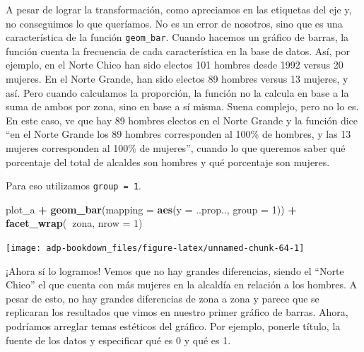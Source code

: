 \documentclass[]{book}
\newenvironment{Shaded}{\begin{snugshade}}{\end{snugshade}}
\newcommand{\DataTypeTok}[1]{\textcolor[rgb]{0.13,0.29,0.53}{#1}}
\newcommand{\DecValTok}[1]{\textcolor[rgb]{0.00,0.00,0.81}{#1}}
\newcommand{\KeywordTok}[1]{\textcolor[rgb]{0.13,0.29,0.53}{\textbf{#1}}}
\newcommand{\NormalTok}[1]{#1}
\newcommand{\OperatorTok}[1]{\textcolor[rgb]{0.81,0.36,0.00}{\textbf{#1}}}
\newcommand{\StringTok}[1]{\textcolor[rgb]{0.31,0.60,0.02}{#1}}
\begin{document}
A pesar de lograr la transformación, como apreciamos en las etiquetas
del eje y, no conseguimos lo que queríamos. No es un error de nosotros,
sino que es una característica de la función \texttt{geom\_bar}. Cuando
hacemos un gráfico de barras, la función cuenta la frecuencia de cada
característica en la base de datos. Así, por ejemplo, en el Norte Chico
han sido electos 101 hombres desde 1992 versus 20 mujeres. En el Norte
Grande, han sido electos 89 hombres versus 13 mujeres, y así. Pero
cuando calculamos la proporción, la función no la calcula en base a la
suma de ambos por zona, sino en base a sí misma. Suena complejo, pero no
lo es. En este caso, ve que hay 89 hombres electos en el Norte Grande y
la función dice ``en el Norte Grande los 89 hombres corresponden al
100\% de hombres, y las 13 mujeres corresponden al 100\% de mujeres'',
cuando lo que queremos saber qué porcentaje del total de alcaldes son
hombres y qué porcentaje son mujeres.

Para eso utilizamos \texttt{group\ =\ 1}.

\begin{Shaded}
\begin{Highlighting}[]
\NormalTok{plot_a }\OperatorTok{+}\StringTok{ }
\StringTok{  }\KeywordTok{geom_bar}\NormalTok{(}\DataTypeTok{mapping =} \KeywordTok{aes}\NormalTok{(}\DataTypeTok{y =}\NormalTok{ ..prop.., }\DataTypeTok{group =} \DecValTok{1}\NormalTok{)) }\OperatorTok{+}
\StringTok{  }\KeywordTok{facet_wrap}\NormalTok{(}\OperatorTok{~}\NormalTok{zona, }\DataTypeTok{nrow =} \DecValTok{1}\NormalTok{)}
\end{Highlighting}
\end{Shaded}

\begin{center}\texttt{[image: adp-bookdown\_files/figure-latex/unnamed-chunk-64-1]} \end{center}

¡Ahora sí lo logramos! Vemos que no hay grandes diferencias, siendo el
``Norte Chico'' el que cuenta con más mujeres en la alcaldía en relación
a los hombres. A pesar de esto, no hay grandes diferencias de zona a
zona y parece que se replicaran los resultados que vimos en nuestro
primer gráfico de barras. Ahora, podríamos arreglar temas estéticos del
gráfico. Por ejemplo, ponerle título, la fuente de los datos y
especificar qué es 0 y qué es 1.
\end{document}
